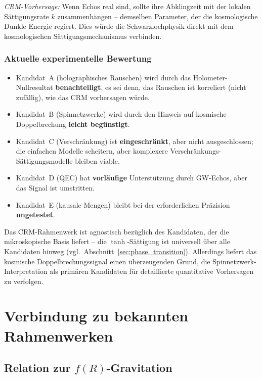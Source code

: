\documentclass[11pt,a4paper]{article}
\begin{document}
\textit{CRM-Vorhersage:} Wenn Echos real sind, sollte ihre Abklingzeit mit der lokalen S\"attigungsrate $k$ zusammenh\"angen -- demselben Parameter, der die kosmologische Dunkle Energie regiert. Dies w\"urde die Schwarzlochphysik direkt mit dem kosmologischen S\"attigungsmechanismus verbinden.

\subsubsection{Aktuelle experimentelle Bewertung}

\begin{itemize}
\item Kandidat~A (holographisches Rauschen) wird durch das Holometer-Nullresultat \textbf{benachteiligt}, es sei denn, das Rauschen ist korreliert (nicht zuf\"allig), wie das CRM vorhersagen w\"urde.
\item Kandidat~B (Spinnetzwerke) wird durch den Hinweis auf kosmische Doppelbrechung \textbf{leicht beg\"unstigt}.
\item Kandidat~C (Verschr\"ankung) ist \textbf{eingeschr\"ankt}, aber nicht ausgeschlossen; die einfachen Modelle scheitern, aber komplexere Verschr\"ankungs-S\"attigungsmodelle bleiben viable.
\item Kandidat~D (QEC) hat \textbf{vorl\"aufige} Unterst\"utzung durch GW-Echos, aber das Signal ist umstritten.
\item Kandidat~E (kausale Mengen) bleibt bei der erforderlichen Pr\"azision \textbf{ungetestet}.
\end{itemize}

Das CRM-Rahmenwerk ist agnostisch bez\"uglich des Kandidaten, der die mikroskopische Basis liefert -- die $\tanh$-S\"attigung ist universell \"uber alle Kandidaten hinweg (vgl.\ Abschnitt~\ref{sec:phase_transition}). Allerdings liefert das kosmische Doppelbrechungssignal einen \"uberzeugenden Grund, die Spinnetzwerk-Interpretation als prim\"aren Kandidaten f\"ur detaillierte quantitative Vorhersagen zu verfolgen.


\section{Verbindung zu bekannten Rahmenwerken}
\label{sec:connections}

\subsection{Relation zur $f(R)$-Gravitation}
\end{document}
